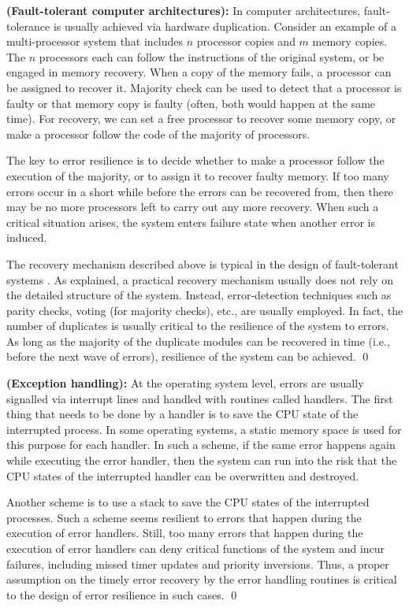\begin{example} 
{\bf (Fault-tolerant computer architectures):}  
\label{exmp.avi}
In computer architectures, fault-tolerance is usually achieved via hardware duplication.  
Consider an example of a multi-processor system that includes $n$ processor copies and $m$ memory copies.  
The $n$ processors each can follow the instructions of the original system, or be engaged in memory recovery. 
When a copy of the memory fails, a processor can be assigned to recover it.
Majority check can be used to detect that a processor is faulty or that memory copy is faulty (often, both would happen at the same time).
For recovery, we can set a free processor to recover some memory copy, or make a processor follow the code of the majority of processors.

The key to error resilience is to decide whether to make a processor follow the execution of the majority, or to assign it to recover faulty memory.
If too many errors occur in a short while before the errors can be recovered from, then there may be no more processors left to carry out any more recovery. 
When such a critical situation arises, the system enters failure state when another error is induced.  

The recovery mechanism described above is typical in the design of fault-tolerant systems \cite{Pradhan96}.  
As explained, a practical recovery mechanism usually does not rely on the detailed structure of the system.  
Instead, error-detection techniques such as parity checks, voting (for majority checks), etc., are usually employed.  
In fact, the number of duplicates is usually critical to the resilience of the system to errors.
As long as the majority of the duplicate modules can be recovered in time (i.e., before the next wave of errors), resilience of the system can be achieved. 
\qed 
\end{example} 

\begin{example} {\bf (Exception handling):} 
\label{exmp.ehan} 
At the operating system level, errors are usually signalled via interrupt lines and handled with routines called handlers.
The first thing that needs to be done by a handler is to save the CPU state of the interrupted process.
In some operating systems, a static memory space is used for this purpose for each handler. 
In such a scheme, if the same error happens again while executing the error handler, then the system can run into the risk that the CPU states of the interrupted handler can be overwritten and destroyed. 

Another scheme is to use a stack to save the CPU states of the interrupted processes.  
Such a scheme seems resilient to errors that happen during the execution of error handlers.
Still, too many errors that happen during the execution of error handlers
can deny critical functions of the system and incur failures, including missed timer updates and priority inversions.
Thus, a proper assumption on the timely error recovery by the error handling routines is critical to the design of 
error resilience in such cases.
\qed 
\end{example} 

